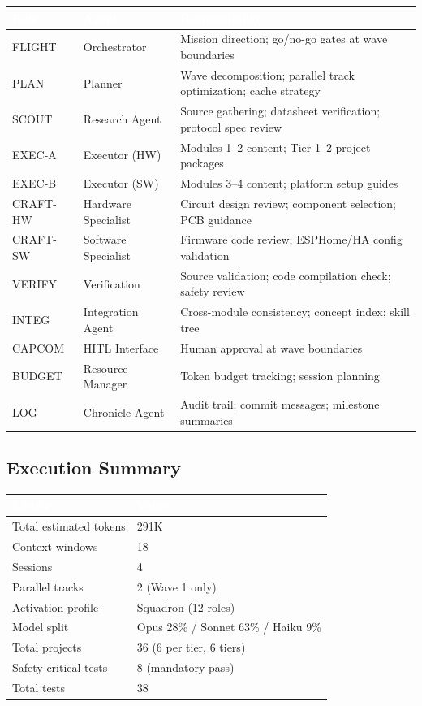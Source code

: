 \documentclass[11pt,letterpaper]{article}
\newcommand{\tableheader}[1]{\textbf{\sffamily\textcolor{white}{#1}}}
\begin{document}
\begin{center}
\begin{tabularx}{\textwidth}{L{2cm}L{2.5cm}X}
\toprule
{}
\tableheader{Role} & \tableheader{Agent} & \tableheader{Responsibility} \\
\midrule
FLIGHT & Orchestrator & Mission direction; go/no-go gates at wave boundaries \\
PLAN & Planner & Wave decomposition; parallel track optimization; cache strategy \\
SCOUT & Research Agent & Source gathering; datasheet verification; protocol spec review \\
EXEC-A & Executor (HW) & Modules 1--2 content; Tier 1--2 project packages \\
EXEC-B & Executor (SW) & Modules 3--4 content; platform setup guides \\
CRAFT-HW & Hardware Specialist & Circuit design review; component selection; PCB guidance \\
CRAFT-SW & Software Specialist & Firmware code review; ESPHome/HA config validation \\
VERIFY & Verification & Source validation; code compilation check; safety review \\
INTEG & Integration Agent & Cross-module consistency; concept index; skill tree \\
CAPCOM & HITL Interface & Human approval at wave boundaries \\
BUDGET & Resource Manager & Token budget tracking; session planning \\
LOG & Chronicle Agent & Audit trail; commit messages; milestone summaries \\
\bottomrule
\end{tabularx}
\end{center}

\subsection{Execution Summary}

\begin{center}
\begin{tabularx}{\textwidth}{L{5cm}X}
\toprule
{}
\tableheader{Metric} & \tableheader{Value} \\
\midrule
Total estimated tokens & 291K \\
Context windows & 18 \\
Sessions & 4 \\
Parallel tracks & 2 (Wave 1 only) \\
Activation profile & Squadron (12 roles) \\
Model split & Opus 28\% / Sonnet 63\% / Haiku 9\% \\
Total projects & 36 (6 per tier, 6 tiers) \\
Safety-critical tests & 8 (mandatory-pass) \\
Total tests & 38 \\
\bottomrule
\end{tabularx}
\end{center}
\end{document}
